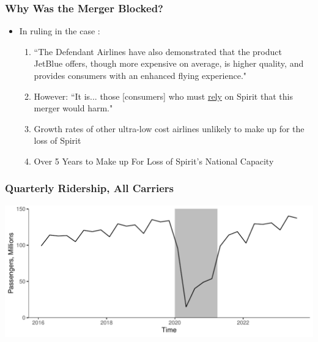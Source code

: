 \documentclass[xcolor=dvipsnames]{beamer}
\begin{document}
    \begin{frame}
        \frametitle{Why Was the Merger Blocked?}
        \begin{itemize}
            \item In ruling in the case \cite{william_g_young_findings_2024}:
            \begin{enumerate}
            \item ``The Defendant Airlines have also demonstrated that the product JetBlue offers, though more expensive on average, is higher quality, and provides consumers with an enhanced flying experience."
            \item   However: ``It is... those [consumers] who must \underline{rely} on Spirit that this merger would harm."
                \item Growth rates of other ultra-low cost airlines unlikely to make up for the loss of Spirit
                \item Over 5 Years to Make up For Loss of Spirit's National Capacity
            \end{enumerate}
        \end{itemize}
    \end{frame}

    \begin{frame}
        \frametitle{Quarterly Ridership, All Carriers}
        \includegraphics[width = \linewidth]{Quarterly_DB1B_Itineraries}
    \end{frame}
\end{document}
